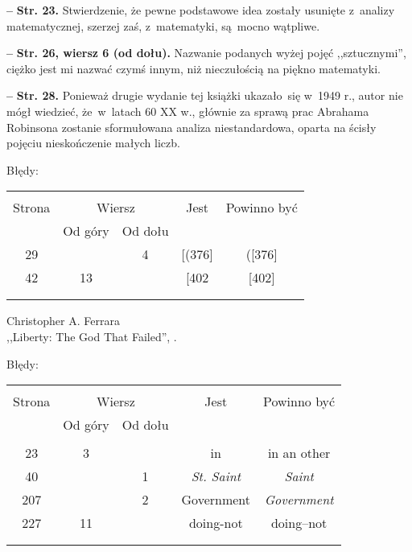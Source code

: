 \documentclass[a4paper,11pt]{article}
\newcommand{\tb}{\textbf}
\newcommand{\Str}[1]{\textbf{Str. #1.}}
\newcommand{\StrWd}[2]{\textbf{Str. #1, wiersz #2 (od dołu).}}
\newcommand{\noi}{\noindent}
\newcommand{\start}{\noi \tb{--} {}}
\newcommand{\Work}[1]{ \begin{center} {\large #1} \end{center} }
\begin{document}
\start \Str{23} Stwierdzenie, że pewne podstawowe idea zostały
usunięte z~analizy matematycznej, szerzej zaś, z~matematyki, są~mocno
wątpliwe.

\start \StrWd{26}{6} Nazwanie podanych wyżej pojęć ,,sztucznymi'',
ciężko jest mi nazwać czymś innym, niż nieczułością na piękno
matematyki.

\start \Str{28} Ponieważ drugie wydanie tej książki ukazało~się w~1949
r., autor nie mógł wiedzieć, że~w~latach 60 XX w., głównie za sprawą
prac Abrahama Robinsona zostanie sformułowana analiza niestandardowa,
oparta na ścisły pojęciu nieskończenie małych liczb.

Błędy:\\
\begin{center}
  \begin{tabular}{|c|c|c|c|c|}
    \hline
    & \multicolumn{2}{c|}{} & & \\
    Strona & \multicolumn{2}{c|}{Wiersz}& Jest & Powinno być \\ \cline{2-3}
    & Od góry & Od dołu &  &  \\ \hline
    29 & & 4 & [(376] & ([376] \\
    42 & 13 & & [402 & [402] \\
    & & & & \\
    & & & & \\ \hline
  \end{tabular}
\end{center}


\Work{
  Christopher A. Ferrara\\
  ,,Liberty: The God That Failed'', \cite{Fer12}. }

Błędy:\\
\begin{center}
  \begin{tabular}{|c|c|c|c|c|}
    \hline
    & \multicolumn{2}{c|}{} & & \\
    Strona & \multicolumn{2}{c|}{Wiersz}& Jest & Powinno być \\ \cline{2-3}
    & Od góry & Od dołu &  &  \\ \hline
    & & & & \\
    23 & 3 & & in & in an other \\
    40 & & 1 & \emph{St. Saint} & \emph{Saint} \\
    207 & & 2 & Government & \emph{Government} \\
    227 & 11 & & doing-not & doing--not \\
    & & & & \\
    & & & & \\ \hline
  \end{tabular}
\end{center}
\end{document}
